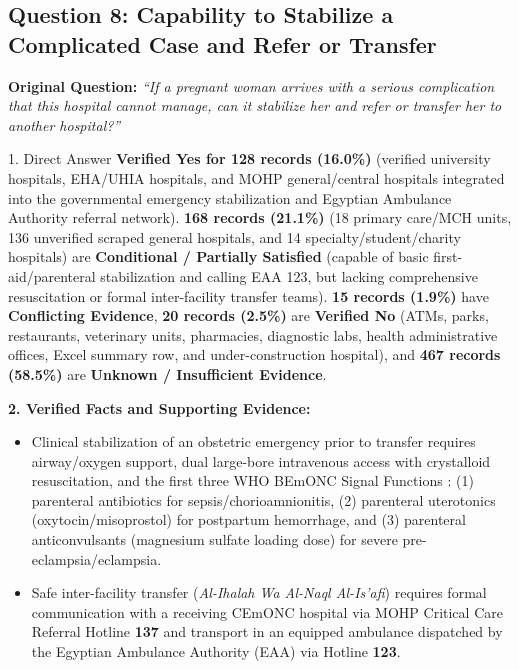 \documentclass[10pt,a4paper]{article}
\begin{document}
\subsection{Question 8: Capability to Stabilize a Complicated Case and Refer or Transfer}
\textbf{Original Question:} \textit{``If a pregnant woman arrives with a serious complication that this hospital cannot manage, can it stabilize her and refer or transfer her to another hospital?''}

\begin{auditbox}{1. Direct Answer}
\textbf{Verified Yes for 128 records (16.0\%)} (verified university hospitals, EHA/UHIA hospitals, and MOHP general/central hospitals integrated into the governmental emergency stabilization and Egyptian Ambulance Authority referral network). \textbf{168 records (21.1\%)} (18 primary care/MCH units, 136 unverified scraped general hospitals, and 14 specialty/student/charity hospitals) are \textbf{Conditional / Partially Satisfied} (capable of basic first-aid/parenteral stabilization and calling EAA 123, but lacking comprehensive resuscitation or formal inter-facility transfer teams). \textbf{15 records (1.9\%)} have \textbf{Conflicting Evidence}, \textbf{20 records (2.5\%)} are \textbf{Verified No} (ATMs, parks, restaurants, veterinary units, pharmacies, diagnostic labs, health administrative offices, Excel summary row, and under-construction hospital), and \textbf{467 records (58.5\%)} are \textbf{Unknown / Insufficient Evidence}.
\end{auditbox}

\textbf{2. Verified Facts and Supporting Evidence:}
\begin{itemize}
    \item Clinical stabilization of an obstetric emergency prior to transfer requires airway/oxygen support, dual large-bore intravenous access with crystalloid resuscitation, and the first three WHO BEmONC Signal Functions \cite{who2009emonc}: (1) parenteral antibiotics for sepsis/chorioamnionitis, (2) parenteral uterotonics (oxytocin/misoprostol) for postpartum hemorrhage, and (3) parenteral anticonvulsants (magnesium sulfate loading dose) for severe pre-eclampsia/eclampsia.
    \item Safe inter-facility transfer (\textit{Al-Ihalah Wa Al-Naql Al-Is'afi}) requires formal communication with a receiving CEmONC hospital via MOHP Critical Care Referral Hotline \textbf{137} and transport in an equipped ambulance dispatched by the Egyptian Ambulance Authority (EAA) via Hotline \textbf{123}.
\end{itemize}
\end{document}

